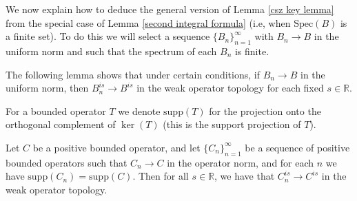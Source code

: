     We now explain how to deduce the general version of Lemma \ref{csz key lemma} from the special case of Lemma \ref{second integral formula} (i.e, when $\mathrm{Spec}(B)$ is a finite set).
    To do this we will select a sequence $\{B_n\}_{n=1}^\infty$ with $B_n\to B$ in the uniform norm and such that the spectrum of each $B_n$ is finite.
    
    The following lemma shows that under certain conditions, if $B_n\to B$ in the uniform norm, then $B_n^{is} \to B^{is}$ in the weak operator topology for each fixed $s \in \mathbb{R}$.    

    { For a bounded operator $T$ we denote $\mathrm{supp}(T)$ for the projection onto the orthogonal complement of $\ker(T)$ (this is the support projection of $T$).}
    \begin{lem}\label{unitary group lemma}
        Let $C$ be a positive bounded operator, and let $\{C_n\}_{n=1}^\infty$ be a sequence of positive bounded operators such that $C_n\to C$ in the operator norm,
        and for each $n$ we have $\mathrm{supp}(C_n) = \mathrm{supp}(C)$. Then for all $s \in \mathbb{R}$, we have that $C_n^{is}\to C^{is}$ in the weak operator topology.
    \end{lem}

